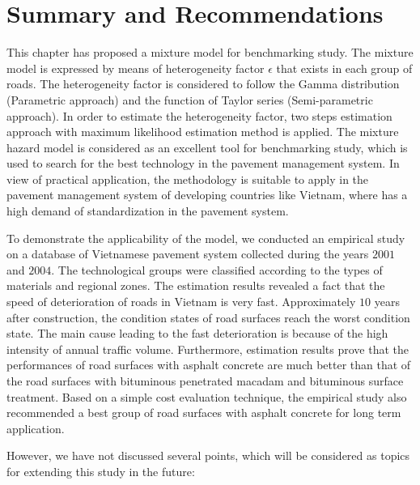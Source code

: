 \section{Summary and Recommendations}
\label{67}
This chapter has proposed a mixture model for benchmarking study. The mixture model is expressed by means of heterogeneity factor $\epsilon$ that exists in each group of roads. The heterogeneity factor is considered to follow the Gamma distribution (Parametric approach) and the function of Taylor series (Semi-parametric approach). In order to estimate the heterogeneity factor, two steps estimation approach with maximum likelihood estimation method is applied. The mixture hazard model is considered as an excellent tool for benchmarking study, which is used to search for the best technology in the pavement management system. In view of practical application, the methodology is suitable to apply in the pavement management system of developing countries like Vietnam, where has a high demand of standardization in the pavement system.

To demonstrate the applicability of the model, we conducted an empirical study on a database of Vietnamese pavement system collected during the years $2001$ and $2004$. The technological groups were classified according to the types of materials and regional zones. The estimation results revealed a fact that the speed of deterioration of roads in Vietnam is very fast. Approximately $10$ years after construction, the condition states of road surfaces reach the worst condition state. The main cause leading to the fast deterioration is because of the high intensity of annual traffic volume. Furthermore, estimation results prove that the performances of road surfaces with asphalt concrete are much better than that of the road surfaces with bituminous penetrated macadam and bituminous surface treatment. Based on a simple cost evaluation technique, the empirical study also recommended a best group of road surfaces with asphalt concrete for long term application. 

However, we have not discussed several points, which will be considered as topics for extending this study in the future:

